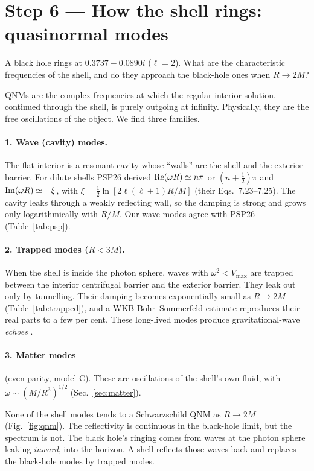 \documentclass[11pt,a4paper]{article}
\numberwithin{equation}{section}
\begin{document}
\section{Step 6 --- How the shell rings: quasinormal modes}\label{sec:qnm}
\begin{question}
A black hole rings at $0.3737-0.0890i$ ($\ell=2$). What are the characteristic frequencies of the shell, and do they
approach the black-hole ones when $R\to2M$?
\end{question}
QNMs are the complex frequencies at which the regular interior solution, continued through the shell, is purely outgoing
at infinity. Physically, they are the free oscillations of the object. We find three families.

\paragraph{1. Wave (cavity) modes.} The flat interior is a resonant cavity whose ``walls'' are the shell and the
exterior barrier. For dilute shells PSP26 derived ${\rm Re}(\omega R)\simeq n\pi$ or $(n+\tfrac12)\pi$ and
${\rm Im}(\omega R)\simeq-\xi$, with $\xi=\tfrac12\ln[2\ell(\ell+1)R/M]$ (their Eqs.~7.23--7.25). The cavity leaks through a
weakly reflecting wall, so the damping is strong and grows only logarithmically with $R/M$. Our wave modes agree with
PSP26 (Table~\ref{tab:psp}).

\paragraph{2. Trapped modes ($R<3M$).} When the shell is inside the photon sphere, waves with $\omega^2<V_{\max}$ are
trapped between the interior centrifugal barrier and the exterior barrier. They leak out only by tunnelling. Their
damping becomes exponentially small as $R\to2M$ (Table~\ref{tab:trapped}), and a WKB Bohr--Sommerfeld estimate reproduces
their real parts to a few per cent. These long-lived modes produce gravitational-wave \emph{echoes}
\cite{Cardoso2016PRL,Abedi2017}.

\paragraph{3. Matter modes} (even parity, model C). These are oscillations of the shell's own fluid, with
$\omega\sim(M/R^3)^{1/2}$ (Sec.~\ref{sec:matter}).

\begin{keyidea}
None of the shell modes tends to a Schwarzschild QNM as $R\to2M$ (Fig.~\ref{fig:qnm}). The reflectivity is continuous in
the black-hole limit, but the spectrum is not. The black hole's ringing comes from waves at the photon sphere leaking
\emph{inward}, into the horizon. A shell reflects those waves back and replaces the black-hole modes by trapped modes.
\end{keyidea}
\end{document}
